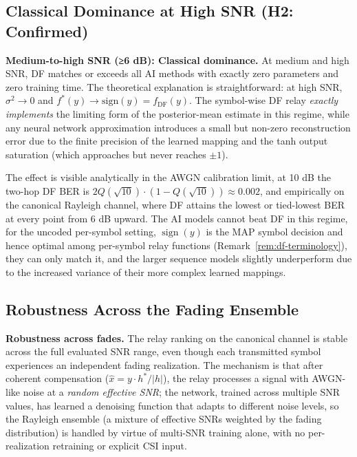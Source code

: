 \subsection{Classical Dominance at High SNR (H2: Confirmed)}\label{sec:classical-dominance-at-high-snr-h2-confirmed}

\textbf{Medium-to-high SNR (≥6 dB): Classical dominance.} At medium and high SNR, DF matches or exceeds all AI methods with exactly zero parameters and zero training time. The theoretical explanation is straightforward: at high SNR, \(\sigma^2 \to 0\) and \(f^*(y) \to \text{sign}(y) = f_{\text{DF}}(y)\). The symbol-wise DF relay \emph{exactly implements} the limiting form of the posterior-mean estimate in this regime, while any neural network approximation introduces a small but non-zero reconstruction error due to the finite precision of the learned mapping and the tanh output saturation (which approaches but never reaches \(\pm 1\)).

The effect is visible analytically in the AWGN calibration limit, at 10 dB the two-hop DF BER is \(2Q(\sqrt{10}) \cdot (1 - Q(\sqrt{10})) \approx 0.002\), and empirically on the canonical Rayleigh channel, where DF attains the lowest or tied-lowest BER at every point from 6 dB upward. The AI models cannot beat DF in this regime, for the uncoded per-symbol setting, $\operatorname{sign}(y)$ is the MAP symbol decision and hence optimal among per-symbol relay functions (Remark~\ref{rem:df-terminology}), they can only match it, and the larger sequence models slightly underperform due to the increased variance of their more complex learned mappings.

\subsection{Robustness Across the Fading Ensemble}\label{sec:channel-robustness}

\textbf{Robustness across fades.} The relay ranking on the canonical channel is stable across the full evaluated SNR range, even though each transmitted symbol experiences an independent fading realization. The mechanism is that after coherent compensation (\(\hat{x} = y \cdot h^*/|h|\)), the relay processes a signal with AWGN-like noise at a \emph{random effective SNR}; the network, trained across multiple SNR values, has learned a denoising function that adapts to different noise levels, so the Rayleigh ensemble (a mixture of effective SNRs weighted by the fading distribution) is handled by virtue of multi-SNR training alone, with no per-realization retraining or explicit CSI input.

